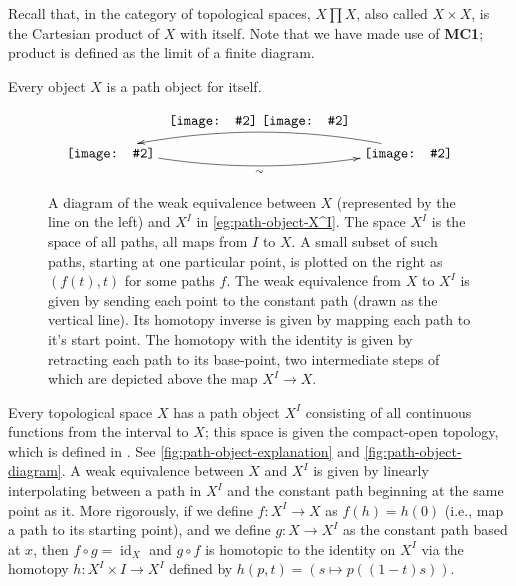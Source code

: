\documentclass{amsart}
\theoremstyle{definition} \newaliasedtheorem{defn}[thm]{Definition}
\theoremstyle{definition} \newtheorem*{defn*}{Definition}
\theoremstyle{definition} \newaliasedtheorem{xca}[thm]{Exercise}
\theoremstyle{definition} \newtheorem*{soln*}{Solution}
\theoremstyle{definition} \newaliasedtheorem{remark}[thm]{Remark}
\theoremstyle{definition} \newtheorem*{remark*}{Remark}
\newcommand{\xyincludegraphics}[2][]{\raisebox{-0.5\height}{\texttt{[image: \#2]}}}
\DeclareMathOperator{\id}{id}
\begin{document}
    Recall that, in the category of topological spaces, $X \prod X$, also called $X \times X$, is the Cartesian product of $X$ with itself.  Note that we have made use of \textbf{MC1}; product is defined as the limit of a finite diagram.
    
    \begin{example}
      Every object $X$ is a path object for itself.
    \end{example}
    
    \begin{example} \label{eg:path-object-X^I} %
%      
      \begin{figure}[htb]
        \[
        \xymatrix{
          \xyincludegraphics[width=6em]{path_object-X} \ar@/_1pc/[rrrrr]_-{\sim}
          &&&&&
          \xyincludegraphics[width=8em]{path_object-X^I} \ar@/_1pc/[lllll]_-{
            \xyincludegraphics[width=6em]{path_object-X^I_2o3}\ 
            \xyincludegraphics[width=6em]{path_object-X^I_1o3}
          }
        }
        \]
        \caption[Path Objects]{A diagram of the weak equivalence between $X$ (represented by the line on the left) and $X^I$ in \autoref{eg:path-object-X^I}.  The space $X^I$ is the space of all paths, all maps from $I$ to $X$.  A small subset of such paths, starting at one particular point, is plotted on the right as $(f(t), t)$ for some paths $f$.  The weak equivalence from $X$ to $X^I$ is given by sending each point to the constant path (drawn as the vertical line).  Its homotopy inverse is given by mapping each path to it's start point.  The homotopy with the identity is given by retracting each path to its base-point, two intermediate steps of which are depicted above the map $X^I \to X$.} \label{fig:path-object-explanation}
      \end{figure}
%      
      Every topological space $X$ has a path object $X^I$ consisting of all continuous functions from the interval to $X$; this space is given the compact-open topology, which is defined in \cite{fox1945topologies,wiki:CompactOpenTopology}.  See \autoref{fig:path-object-explanation} and \autoref{fig:path-object-diagram}.  A weak equivalence between $X$ and $X^I$ is given by linearly interpolating between a path in $X^I$ and the constant path beginning at the same point as it.  More rigorously, if we define $f : X^I \to X$ as $f(h) = h(0)$ (i.e., map a path to its starting point), and we define $g : X \to X^I$ as the constant path based at $x$, then $f \circ g = \id_X$ and $g \circ f$ is homotopic to the identity on $X^I$ via the homotopy $h : X^I \times I \to X^I$ defined by $h(p, t) = (s \mapsto p((1 - t) s))$.
      

\end{example}
\end{document}
